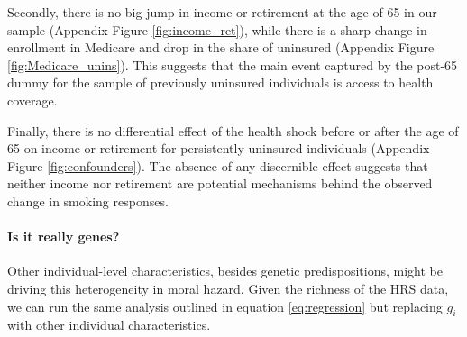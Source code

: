 \documentclass[11pt]{article}
\begin{document}
Secondly, there is no big jump in income or retirement at the age of 65 in our sample (Appendix Figure \ref{fig:income_ret}), while there is a sharp change in enrollment in Medicare and drop in the share of uninsured (Appendix Figure \ref{fig:Medicare_unins}). This suggests that the main event captured by the post-65 dummy for the sample of previously uninsured individuals is access to health coverage.

Finally, there is no differential effect of the health shock before or after the age of 65 on income or retirement for persistently uninsured individuals (Appendix Figure \ref{fig:confounders}).
The absence of any discernible effect suggests that neither income nor retirement are potential mechanisms behind the observed change in smoking responses.

\paragraph{Is it really genes?}
Other individual-level characteristics, besides genetic predispositions, might be driving this heterogeneity in moral hazard.
Given the richness of the HRS data, we can run the same analysis outlined in equation \ref{eq:regression} but replacing $g_i$ with other individual characteristics.
\end{document}
